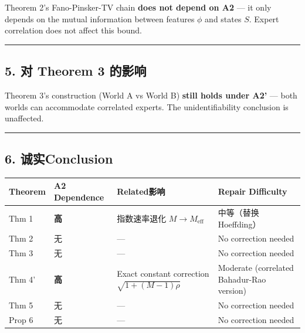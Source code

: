\documentclass[
  12pt,
]{ctexart}
\begin{document}
Theorem 2's Fano-Pinsker-TV chain \textbf{does not depend on A2} --- it only depends on the mutual information between features
\(\phi\) and states \(S\). Expert correlation does not affect this bound.

\begin{center}\rule{0.5\linewidth}{0.5pt}\end{center}

\subsection{5. 对 Theorem 3
的影响}\label{ux5bf9-theorem-3-ux7684ux5f71ux54cd}

Theorem 3's construction (World A vs World B) \textbf{still holds under A2'}
--- both worlds can accommodate correlated experts. The unidentifiability conclusion is unaffected.

\begin{center}\rule{0.5\linewidth}{0.5pt}\end{center}

\subsection{6. 诚实Conclusion}\label{ux8bdaux5b9eux7ed3ux8bba}

\begin{longtable}[]{@{}
  >{\raggedright\arraybackslash}p{}
  >{\centering\arraybackslash}p{}
  >{\raggedright\arraybackslash}p{}
  >{\centering\arraybackslash}p{}@{}}
\toprule\noalign{}
\begin{minipage}[b]{\linewidth}\raggedright
Theorem
\end{minipage} & \begin{minipage}[b]{\linewidth}\centering
A2 Dependence
\end{minipage} & \begin{minipage}[b]{\linewidth}\raggedright
Related影响
\end{minipage} & \begin{minipage}[b]{\linewidth}\centering
Repair Difficulty
\end{minipage} \\
\midrule\noalign{}
\endhead
\bottomrule\noalign{}
\endlastfoot
Thm 1 & \textbf{高} & 指数速率退化 \(M \to M_{\text{eff}}\) & 中等（替换
Hoeffding） \\
Thm 2 & 无 & --- & No correction needed \\
Thm 3 & 无 & --- & No correction needed \\
Thm 4' & \textbf{高} & Exact constant correction \(\sqrt{1+(M-1)\rho}\) &
Moderate (correlated Bahadur-Rao version) \\
Thm 5 & 无 & --- & No correction needed \\
Prop 6 & 无 & --- & No correction needed \\
\end{longtable}
\end{document}
